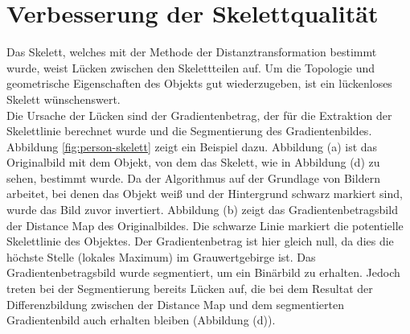 \section{Verbesserung der Skelettqualität}
Das Skelett, welches mit der Methode der Distanztransformation bestimmt wurde, weist Lücken zwischen den Skelettteilen auf. Um die Topologie und geometrische Eigenschaften des Objekts gut wiederzugeben, ist ein lückenloses Skelett wünschenswert. \\
Die Ursache der Lücken sind der Gradientenbetrag, der für die Extraktion der Skelettlinie berechnet wurde und die Segmentierung des Gradientenbildes. Abbildung \ref{fig:person-skelett} zeigt ein Beispiel dazu. Abbildung (a) ist das Originalbild mit dem Objekt, von dem das Skelett, wie in Abbildung (d) zu sehen, bestimmt wurde. Da der Algorithmus auf der Grundlage von Bildern arbeitet, bei denen das Objekt weiß und der Hintergrund schwarz markiert sind,
wurde das Bild zuvor invertiert. Abbildung (b) zeigt das Gradientenbetragsbild der Distance Map des Originalbildes. Die schwarze Linie markiert die potentielle Skelettlinie des Objektes. Der Gradientenbetrag ist hier gleich null, da dies die höchste Stelle (lokales Maximum) im Grauwertgebirge ist. Das Gradientenbetragsbild wurde segmentiert, um ein Binärbild zu erhalten. Jedoch treten bei der Segmentierung
bereits Lücken auf, die bei dem Resultat der Differenzbildung zwischen der Distance Map und dem segmentierten Gradientenbild auch erhalten bleiben (Abbildung (d)). \\\\

